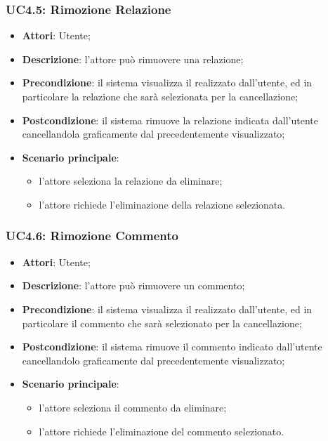\subsubsection{UC4.5: Rimozione Relazione}
\label{UC4.5}
\begin{itemize}
\item \textbf{Attori}: Utente;
\item \textbf{Descrizione}: l'attore può rimuovere una relazione;	
\item \textbf{Precondizione}: il sistema visualizza il  realizzato dall'utente, ed in particolare la relazione che sarà selezionata per la cancellazione;
\item \textbf{Postcondizione}: il sistema rimuove la relazione indicata dall'utente cancellandola graficamente dal  precedentemente visualizzato;
\item \textbf{Scenario principale}:
\begin{itemize}
	\item l'attore seleziona la relazione da eliminare;
	\item l'attore richiede l'eliminazione della relazione selezionata.
\end{itemize}	
\end{itemize}

\subsubsection{UC4.6: Rimozione Commento	}
\label{UC4.6}
\begin{itemize}
\item \textbf{Attori}: Utente;
\item \textbf{Descrizione}: l'attore può rimuovere un commento;
\item \textbf{Precondizione}: il sistema visualizza il  realizzato dall'utente, ed in particolare il commento che sarà selezionato per la cancellazione;
\item \textbf{Postcondizione}: il sistema rimuove il commento indicato dall'utente cancellandolo graficamente dal  precedentemente visualizzato;
\item \textbf{Scenario principale}:
\begin{itemize}
	\item l'attore seleziona il commento da eliminare;
	\item l'attore richiede l'eliminazione del commento selezionato.
\end{itemize}		
\end{itemize}

